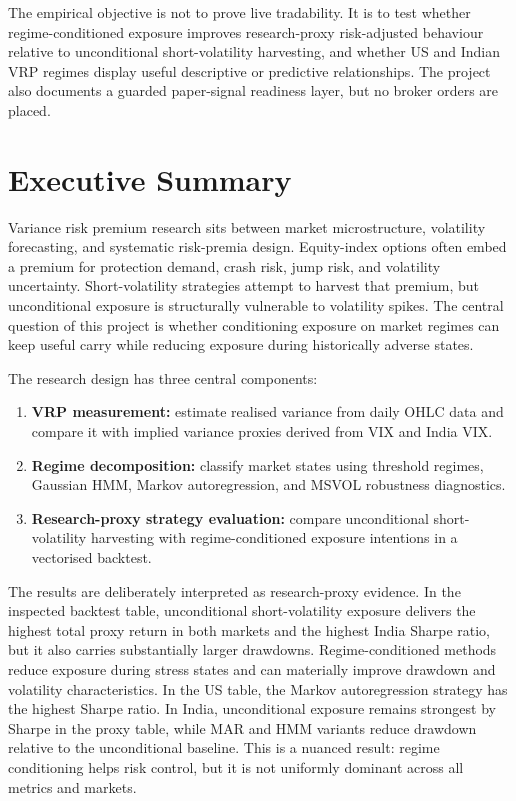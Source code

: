 \documentclass[11pt,a4paper]{article}
\begin{document}
The empirical objective is not to prove live tradability. It is to test whether regime-conditioned exposure improves research-proxy risk-adjusted behaviour relative to unconditional short-volatility harvesting, and whether US and Indian VRP regimes display useful descriptive or predictive relationships. The project also documents a guarded paper-signal readiness layer, but no broker orders are placed.

\section{Executive Summary}

Variance risk premium research sits between market microstructure, volatility forecasting, and systematic risk-premia design. Equity-index options often embed a premium for protection demand, crash risk, jump risk, and volatility uncertainty. Short-volatility strategies attempt to harvest that premium, but unconditional exposure is structurally vulnerable to volatility spikes. The central question of this project is whether conditioning exposure on market regimes can keep useful carry while reducing exposure during historically adverse states.

The research design has three central components:

\begin{enumerate}
    \item \textbf{VRP measurement:} estimate realised variance from daily OHLC data and compare it with implied variance proxies derived from VIX and India VIX.
    \item \textbf{Regime decomposition:} classify market states using threshold regimes, Gaussian HMM, Markov autoregression, and MSVOL robustness diagnostics.
    \item \textbf{Research-proxy strategy evaluation:} compare unconditional short-volatility harvesting with regime-conditioned exposure intentions in a vectorised backtest.
\end{enumerate}

The results are deliberately interpreted as research-proxy evidence. In the inspected backtest table, unconditional short-volatility exposure delivers the highest total proxy return in both markets and the highest India Sharpe ratio, but it also carries substantially larger drawdowns. Regime-conditioned methods reduce exposure during stress states and can materially improve drawdown and volatility characteristics. In the US table, the Markov autoregression strategy has the highest Sharpe ratio. In India, unconditional exposure remains strongest by Sharpe in the proxy table, while MAR and HMM variants reduce drawdown relative to the unconditional baseline. This is a nuanced result: regime conditioning helps risk control, but it is not uniformly dominant across all metrics and markets.
\end{document}

